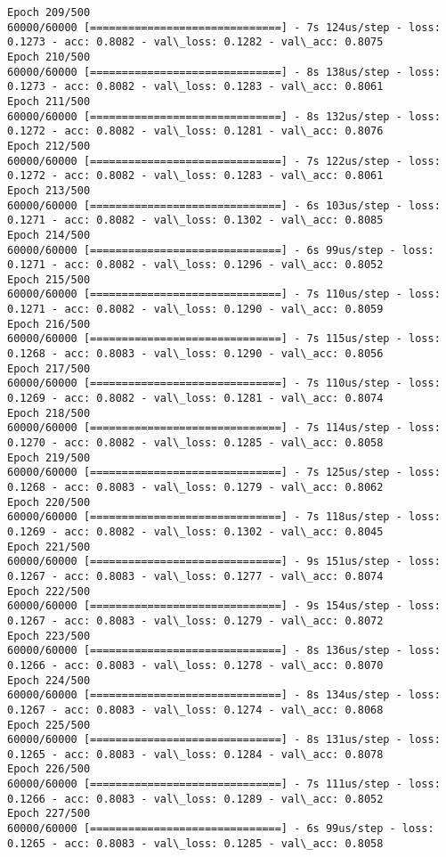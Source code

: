 \documentclass[11pt]{article}
\begin{document}
\begin{Verbatim}[commandchars=\\\{\}]
Epoch 209/500
60000/60000 [==============================] - 7s 124us/step - loss: 0.1273 - acc: 0.8082 - val\_loss: 0.1282 - val\_acc: 0.8075
Epoch 210/500
60000/60000 [==============================] - 8s 138us/step - loss: 0.1273 - acc: 0.8082 - val\_loss: 0.1283 - val\_acc: 0.8061
Epoch 211/500
60000/60000 [==============================] - 8s 132us/step - loss: 0.1272 - acc: 0.8082 - val\_loss: 0.1281 - val\_acc: 0.8076
Epoch 212/500
60000/60000 [==============================] - 7s 122us/step - loss: 0.1272 - acc: 0.8082 - val\_loss: 0.1283 - val\_acc: 0.8061
Epoch 213/500
60000/60000 [==============================] - 6s 103us/step - loss: 0.1271 - acc: 0.8082 - val\_loss: 0.1302 - val\_acc: 0.8085
Epoch 214/500
60000/60000 [==============================] - 6s 99us/step - loss: 0.1271 - acc: 0.8082 - val\_loss: 0.1296 - val\_acc: 0.8052
Epoch 215/500
60000/60000 [==============================] - 7s 110us/step - loss: 0.1271 - acc: 0.8082 - val\_loss: 0.1290 - val\_acc: 0.8059
Epoch 216/500
60000/60000 [==============================] - 7s 115us/step - loss: 0.1268 - acc: 0.8083 - val\_loss: 0.1290 - val\_acc: 0.8056
Epoch 217/500
60000/60000 [==============================] - 7s 110us/step - loss: 0.1269 - acc: 0.8082 - val\_loss: 0.1281 - val\_acc: 0.8074
Epoch 218/500
60000/60000 [==============================] - 7s 114us/step - loss: 0.1270 - acc: 0.8082 - val\_loss: 0.1285 - val\_acc: 0.8058
Epoch 219/500
60000/60000 [==============================] - 7s 125us/step - loss: 0.1268 - acc: 0.8083 - val\_loss: 0.1279 - val\_acc: 0.8062
Epoch 220/500
60000/60000 [==============================] - 7s 118us/step - loss: 0.1269 - acc: 0.8082 - val\_loss: 0.1302 - val\_acc: 0.8045
Epoch 221/500
60000/60000 [==============================] - 9s 151us/step - loss: 0.1267 - acc: 0.8083 - val\_loss: 0.1277 - val\_acc: 0.8074
Epoch 222/500
60000/60000 [==============================] - 9s 154us/step - loss: 0.1267 - acc: 0.8083 - val\_loss: 0.1279 - val\_acc: 0.8072
Epoch 223/500
60000/60000 [==============================] - 8s 136us/step - loss: 0.1266 - acc: 0.8083 - val\_loss: 0.1278 - val\_acc: 0.8070
Epoch 224/500
60000/60000 [==============================] - 8s 134us/step - loss: 0.1267 - acc: 0.8083 - val\_loss: 0.1274 - val\_acc: 0.8068
Epoch 225/500
60000/60000 [==============================] - 8s 131us/step - loss: 0.1265 - acc: 0.8083 - val\_loss: 0.1284 - val\_acc: 0.8078
Epoch 226/500
60000/60000 [==============================] - 7s 111us/step - loss: 0.1266 - acc: 0.8083 - val\_loss: 0.1289 - val\_acc: 0.8052
Epoch 227/500
60000/60000 [==============================] - 6s 99us/step - loss: 0.1265 - acc: 0.8083 - val\_loss: 0.1285 - val\_acc: 0.8058

\end{Verbatim}
\end{document}
